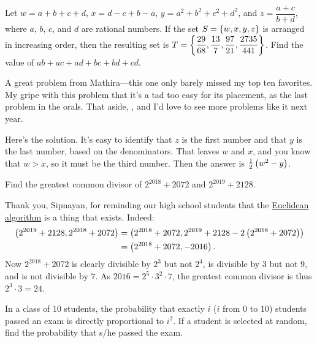 \documentclass[11pt,paper=letter]{scrartcl}
\begin{document}
\begin{probboxed}
   Let $w = a + b + c + d$, $x = d - c + b - a$, $y = a^2 + b^2 + c^2 + d^2$, and $z = \dfrac{a+c}{b+d}$, where $a$, $b$, $c$, and $d$ are rational numbers. If the set $S = \left\{ w, x, y, z \right\}$ is arranged in increasing order, then the resulting set is $T = \left\{ \dfrac{29}{68}, \dfrac{13}7, \dfrac{97}{21}, \dfrac{2735}{441} \right\}$. Find the value of $ab + ac + ad + bc + bd + cd$.
\end{probboxed}

A great problem from Mathira---this one only barely missed my top ten favorites. My gripe with this problem that it's a tad too easy for its placement, as the last problem in the orals. That aside, , and I'd love to see more problems like it next year.

Here's the solution. It's easy to identify that $z$ is the first number and that $y$ is the last number, based on the denominators. That leaves $w$ and $x$, and you know that $w > x$, so it must be the third number. Then the answer is $\frac12\left( w^2 - y \right)$.

\begin{probboxed}
   Find the greatest common divisor of $2^{2018} + 2072$ and $2^{2019} + 2128$.
\end{probboxed}

Thank you, Sipnayan, for reminding our high school students that the \href{https://en.wikipedia.org/wiki/Euclidean_algorithm}{Euclidean algorithm} is a thing that exists. Indeed:
\begin{align*}
  \left( 2^{2019} + 2128, 2^{2018} + 2072 \right)
  &= \left( 2^{2018} + 2072, 2^{2019} + 2128 - 2\left( 2^{2018} + 2072 \right) \right) \\
  &= \left( 2^{2018} + 2072, -2016 \right).
\end{align*}
Now $2^{2018} + 2072$ is clearly divisible by $2^3$ but not $2^4$, is divisible by $3$ but not $9$, and is not divisible by $7$. As $2016 = 2^5 \cdot 3^2 \cdot 7$, the greatest common divisor is thus $2^3 \cdot 3 = 24$.

\begin{probboxed}
   In a class of $10$ students, the probability that exactly $i$ ($i$ from $0$ to $10$) students passed an exam is directly proportional to $i^2$. If a student is selected at random, find the probability that s/he passed the exam.
\end{probboxed}
\end{document}
